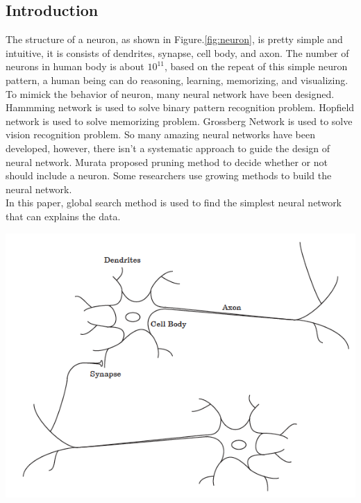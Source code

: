 \documentclass[smallextended]{svjour3}       %
\begin{document}
\begin{multicols}{2}
\section{Introduction}
The structure of a neuron, as shown in Figure.\ref{fig:neuron}, is pretty simple
and intuitive, it is consists of dendrites, synapse, cell body, and axon. The
number of neurons in human body is about $10^{11}$,  based on the repeat of this
simple neuron pattern, a human being can do reasoning, learning, memorizing, and
visualizing.  To mimick the behavior of neuron, many neural network have been
designed.  Hammming network is used to solve binary pattern recognition problem.
Hopfield\cite{hopfield1982neural} network is used to solve memorizing problem.
Grossberg Network\cite{grossberg1976adaptive} is used to solve vision
recognition problem.  So many amazing neural networks have been developed,
however, there isn't a systematic approach to guide the design of neural
network.  Murata\cite{murata1994network} proposed pruning method to decide
whether or not should include a neuron.  Some researchers\cite{demuth2014neural}
use growing methods to build the neural network.\\ 

In this paper, global search method is used to find the simplest neural network
that can explains the data.


\begin{center}
  \includegraphics[width=\linewidth]{neural_network_design_images/neuron1.png}
  \label{fig:neuron}
\end{center}


\end{multicols}
\end{document}
